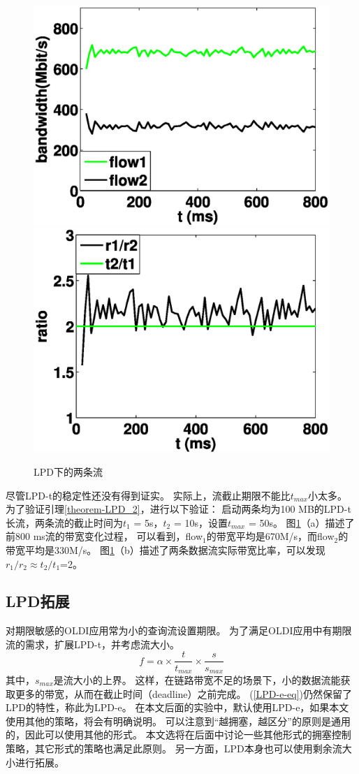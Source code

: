\begin{figure}[h]
\centering
{}
 {\includegraphics[width=0.45\columnwidth]{figures/LPD/rate2.eps}}
{\includegraphics[width=0.45\columnwidth]{figures/LPD/ratio.eps}}
\caption{LPD下的两条流}
\label{rate-analysis-fig}
\end{figure}

尽管LPD-t的稳定性还没有得到证实。
实际上，流截止期限不能比$t_{max}$小太多。
为了验证引理\ref{theorem-LPD_2}，进行以下验证： 
启动两条均为100 MB的LPD-t长流，两条流的截止时间为$t_1$ = 5s，$t_2$ = 10s，设置$t_{max}$ = 50s。 
图\ref{rate-analysis-fig}（a）描述了前800 ms流的带宽变化过程，
可以看到，flow$_1$的带宽平均是670M/s，而flow$_2$的带宽平均是330M/s。
图\ref{rate-analysis-fig}（b）描述了两条数据流实际带宽比率，可以发现$r_1/r_2 \approx t_2 / t_1$=2。

\subsection{LPD拓展}
对期限敏感的OLDI应用常为小的查询流设置期限。
为了满足OLDI应用中有期限流的需求，扩展LPD-t，并考虑流大小。
\begin{equation}\label{LPD-e-eq}
f=\alpha \times \frac{t}{t_{max}} \times \frac{s}{s_{max}}
\end{equation}
其中，$s_{max}$是流大小的上界。
这样，在链路带宽不足的场景下，小的数据流能获取更多的带宽，从而在截止时间（deadline）之前完成。
 (\ref{LPD-e-eq})仍然保留了LPD的特性，称此为LPD-e。 
 在本文后面的实验中，默认使用LPD-e，如果本文使用其他的策略，将会有明确说明。
 可以注意到“越拥塞，越区分”的原则是通用的，因此可以使用其他的形式。
本文选将在后面中讨论一些其他形式的拥塞控制策略，其它形式的策略也满足此原则。
 另一方面，LPD本身也可以使用剩余流大小进行拓展。
 

